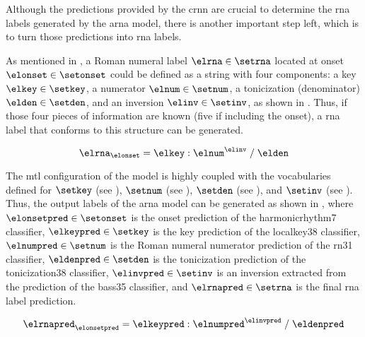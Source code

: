 
Although the predictions provided by the \gls{crnn} are
crucial to determine the \gls{rna} labels generated by the
\gls{arna} model, there is another important step left,
which is to turn those predictions into \gls{rna} labels.

As mentioned in
, a Roman
numeral label $\elrna \in \setrna$ located at onset
$\elonset \in \setonset$ could be defined as a string with
four components: a key $\elkey \in \setkey$, a numerator
$\elnum \in \setnum$, a tonicization (denominator) $\elden
\in \setden$, and an inversion $\elinv \in \setinv$, as
shown in . Thus, if those four pieces of
information are known (five if including the onset), a
\gls{rna} label that conforms to this structure can be
generated.

\begin{equation}
    \label{eq:rna}
    \elrna_{\elonset} = \elkey : \elnum^{\elinv} \; / \; \elden
\end{equation}


The \gls{mtl} configuration of the model is highly coupled
with the vocabularies defined for $\setkey$ (see
), $\setnum$ (see
), $\setden$
(see ), and
$\setinv$ (see
). Thus,
the output labels of the \gls{arna} model can be generated
as shown in , where $\elonsetpred \in
\setonset$ is the onset prediction of the
\gls{harmonicrhythm7} classifier, $\elkeypred \in \setkey$
is the key prediction of the \gls{localkey38} classifier,
$\elnumpred \in \setnum$ is the Roman numeral numerator
prediction of the \gls{rn31} classifier, $\eldenpred \in
\setden$ is the tonicization prediction of the
\gls{tonicization38} classifier, $\elinvpred \in \setinv$ is
an inversion extracted from the prediction of the
\gls{bass35} classifier, and $\elrnapred \in \setrna$ is the
final \gls{rna} label prediction.

\begin{equation}
    \label{eq:rna_pred}
    \elrnapred_{\elonsetpred} = \elkeypred : \elnumpred^{\elinvpred} \; / \; \eldenpred
\end{equation}

